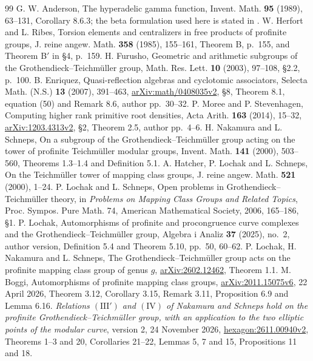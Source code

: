 \documentclass[11pt,a4paper]{article}
\theoremstyle{definition}
\theoremstyle{remark}
\begin{document}
\begin{thebibliography}{99}
 G. W. Anderson, The hyperadelic gamma function, Invent. Math. \textbf{95} (1989), 63--131, Corollary 8.6.3; the beta formulation used here is stated in \cite[Remark 2.4, p.~101]{Furusho2003}.
 W. Herfort and L. Ribes, Torsion elements and centralizers in free products of profinite groups, J. reine angew. Math. \textbf{358} (1985), 155--161, Theorem B, p.~155, and Theorem B$'$ in \S4, p.~159.
 H. Furusho, Geometric and arithmetic subgroups of the Grothendieck--Teichm\"uller group, Math. Res. Lett. \textbf{10} (2003), 97--108, \S2.2, p.~100.
 B. Enriquez, Quasi-reflection algebras and cyclotomic associators, Selecta Math. (N.S.) \textbf{13} (2007), 391--463, \href{https://arxiv.org/abs/math/0408035v2}{arXiv:math/0408035v2}, \S8, Theorem 8.1, equation (50) and Remark 8.6, author pp.~30--32.
 P. Moree and P. Stevenhagen, Computing higher rank primitive root densities, Acta Arith. \textbf{163} (2014), 15--32, \href{https://arxiv.org/abs/1203.4313v2}{arXiv:1203.4313v2}, \S2, Theorem 2.5, author pp.~4--6.
 H. Nakamura and L. Schneps, On a subgroup of the Grothendieck--Teichm\"uller group acting on the tower of profinite Teichm\"uller modular groups, Invent. Math. \textbf{141} (2000), 503--560, Theorems 1.3--1.4 and Definition 5.1.
 A. Hatcher, P. Lochak and L. Schneps, On the Teichm\"uller tower of mapping class groups, J. reine angew. Math. \textbf{521} (2000), 1--24.
 P. Lochak and L. Schneps, Open problems in Grothendieck--Teichm\"uller theory, in \emph{Problems on Mapping Class Groups and Related Topics}, Proc. Sympos. Pure Math. 74, American Mathematical Society, 2006, 165--186, \S1.
 P. Lochak, Automorphisms of profinite and procongruence curve complexes and the Grothendieck--Teichm\"uller group, Algebra i Analiz \textbf{37} (2025), no.~2, author version, Definition 5.4 and Theorem 5.10, pp.~50, 60--62.
 P. Lochak, H. Nakamura and L. Schneps, The Grothendieck--Teichm\"uller group acts on the profinite mapping class group of genus $g$, \href{https://arxiv.org/abs/2602.12462}{arXiv:2602.12462}, Theorem 1.1.
 M. Boggi, Automorphisms of profinite mapping class groups, \href{https://arxiv.org/abs/2011.15075v6}{arXiv:2011.15075v6}, 22 April 2026, Theorem 3.12, Corollary 3.15, Remark 3.11, Proposition 6.9 and Lemma 6.16.
 \emph{Relations $(\mathrm{III}')$ and $(\mathrm{IV})$ of Nakamura and Schneps hold on the profinite Grothendieck--Teichm\"uller group, with an application to the two elliptic points of the modular curve}, version 2, 24 November 2026, \href{https://hexagonmath.org/2611.00940v2}{hexagon:2611.00940v2}, Theorems 1--3 and 20, Corollaries 21--22, Lemmas 5, 7 and 15, Propositions 11 and 18.

\end{thebibliography}
\end{document}
